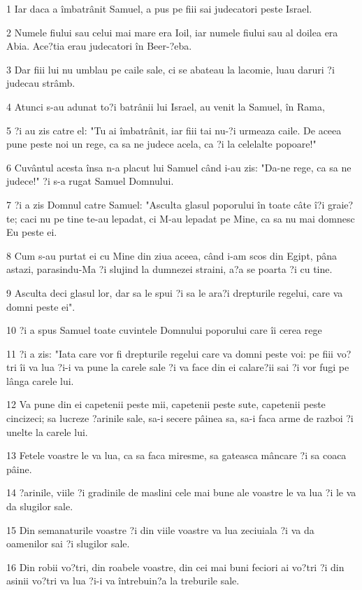 \par 1 Iar daca a îmbatrânit Samuel, a pus pe fiii sai judecatori peste Israel.
\par 2 Numele fiului sau celui mai mare era Ioil, iar numele fiului sau al doilea era Abia. Ace?tia erau judecatori în Beer-?eba.
\par 3 Dar fiii lui nu umblau pe caile sale, ci se abateau la lacomie, luau daruri ?i judecau strâmb.
\par 4 Atunci s-au adunat to?i batrânii lui Israel, au venit la Samuel, în Rama,
\par 5 ?i au zis catre el: "Tu ai îmbatrânit, iar fiii tai nu-?i urmeaza caile. De aceea pune peste noi un rege, ca sa ne judece acela, ca ?i la celelalte popoare!"
\par 6 Cuvântul acesta însa n-a placut lui Samuel când i-au zis: "Da-ne rege, ca sa ne judece!" ?i s-a rugat Samuel Domnului.
\par 7 ?i a zis Domnul catre Samuel: "Asculta glasul poporului în toate câte î?i graie?te; caci nu pe tine te-au lepadat, ci M-au lepadat pe Mine, ca sa nu mai domnesc Eu peste ei.
\par 8 Cum s-au purtat ei cu Mine din ziua aceea, când i-am scos din Egipt, pâna astazi, parasindu-Ma ?i slujind la dumnezei straini, a?a se poarta ?i cu tine.
\par 9 Asculta deci glasul lor, dar sa le spui ?i sa le ara?i drepturile regelui, care va domni peste ei".
\par 10 ?i a spus Samuel toate cuvintele Domnului poporului care îi cerea rege
\par 11 ?i a zis: "Iata care vor fi drepturile regelui care va domni peste voi: pe fiii vo?tri îi va lua ?i-i va pune la carele sale ?i va face din ei calare?ii sai ?i vor fugi pe lânga carele lui.
\par 12 Va pune din ei capetenii peste mii, capetenii peste sute, capetenii peste cincizeci; sa lucreze ?arinile sale, sa-i secere pâinea sa, sa-i faca arme de razboi ?i unelte la carele lui.
\par 13 Fetele voastre le va lua, ca sa faca miresme, sa gateasca mâncare ?i sa coaca pâine.
\par 14 ?arinile, viile ?i gradinile de maslini cele mai bune ale voastre le va lua ?i le va da slugilor sale.
\par 15 Din semanaturile voastre ?i din viile voastre va lua zeciuiala ?i va da oamenilor sai ?i slugilor sale.
\par 16 Din robii vo?tri, din roabele voastre, din cei mai buni feciori ai vo?tri ?i din asinii vo?tri va lua ?i-i va întrebuin?a la treburile sale.
